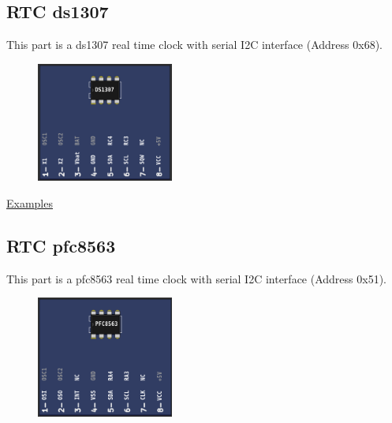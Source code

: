 \vspace{0.5cm}

\vspace{0.5cm}

\subsection{RTC ds1307}

This part is a ds1307 real time clock with serial I2C interface (Address 0x68).

\begin{figure}[H]
\center
\includegraphics[width=0.4\textwidth]{img/part_ds1307.png} 
\end{figure}

\href{https://lcgamboa.github.io/picsimlab_examples/parts_RTC_ds1307.html}{Examples}

\vspace{0.5cm}

\subsection{RTC pfc8563}

This part is a pfc8563 real time clock with serial I2C interface (Address 0x51).

\begin{figure}[H]
\center
\includegraphics[width=0.4\textwidth]{img/part_pcf8563.png} 
\end{figure}

